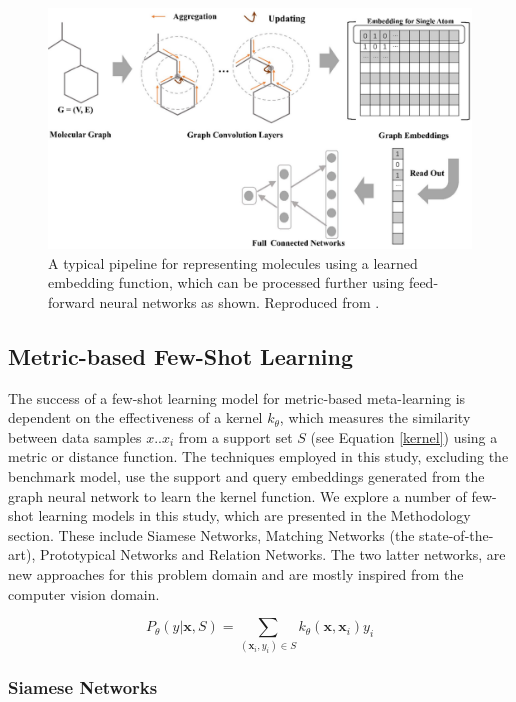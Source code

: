 \begin{figure}[h]
	\centering
	\includegraphics[width=0.9\linewidth]{img/graph_mol_embedding.png}
	\caption[Learned Embedding through a GCN]{A typical pipeline for representing molecules using a learned embedding function, which can be processed further using feed-forward neural networks as shown. Reproduced from \citet{jiang2021could}.}
	\label{fig:neuralgraphfingerprint}
  \end{figure}

\subsection{Metric-based Few-Shot Learning}

The success of a few-shot learning model for metric-based meta-learning is dependent on the effectiveness of a kernel $k_\theta$, which measures the similarity between data samples ${x..x_i}$ from a support set $S$ (see Equation \ref{kernel}) using a metric or distance function. The techniques employed in this study, excluding the benchmark model, use the support and query embeddings generated from the graph neural network to learn the kernel function. We explore a number of few-shot learning models in this study, which are presented in the Methodology section. These include Siamese Networks, Matching Networks (the state-of-the-art), Prototypical Networks and Relation Networks. The two latter networks, are new approaches for this problem domain and are mostly inspired from the computer vision domain.

\begin{equation}
	\label{kernel}
	P_\theta(y \vert \mathbf{x}, S) = \sum_{(\mathbf{x}_i, y_i) \in S} k_\theta(\mathbf{x}, \mathbf{x}_i)y_i
\end{equation}

\subsubsection{Siamese Networks}

